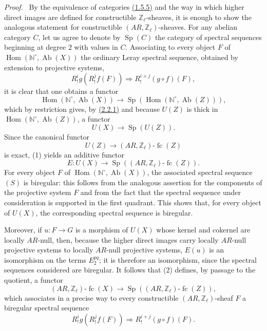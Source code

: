 \documentclass[11pt]{article}
\newenvironment{prooftext}[1][Proof]{\par\noindent\emph{#1.}\ }{\par\medskip}
\DeclareMathOperator{\Hom}{Hom}
\providecommand{\Hom}{\operatorname{Hom}}
\providecommand{\Sp}{\operatorname{Sp}}
\providecommand{\Ab}{\operatorname{Ab}}
\providecommand{\fc}{\operatorname{fc}}
\providecommand{\Ab}{\operatorname{Ab}}
\providecommand{\Hom}{\operatorname{Hom}}
\begin{document}
\begin{prooftext}[Proof]
By the equivalence of categories \hyperref[sga5:VI:proposition:1.5.5]{(1.5.5)} and the way in which higher direct images are defined for constructible \(\mathbb Z_\ell\)-sheaves, it is enough to show the analogous statement for constructible \((AR,\mathbb Z_\ell)\)-sheaves. For any abelian category \(C\), let us agree to denote by \(\Sp(C)\) the category of spectral sequences beginning at degree \(2\) with values in \(C\). Associating to every object \(F\) of \(\Hom(\mathbb N^\circ,\Ab(X))\) the ordinary Leray spectral sequence, obtained by extension to projective systems,
\[
R^i_! g(R^j_! f(F))\Longrightarrow R^{i+j}_!(g\circ f)(F),
\tag{S}\label{sga5:VI:equation:s}
\]
it is clear that one obtains a functor
\[
\Hom(\mathbb N^\circ,\Ab(X))\longrightarrow \Sp(\Hom(\mathbb N^\circ,\Ab(Z))),
\]
which by restriction gives, by \hyperref[sga5:VI:lemma:2.2.1]{(2.2.1)} and because \(U(Z)\) is thick in \(\Hom(\mathbb N^\circ,\Ab(Z))\), a functor
\[
U(X)\longrightarrow \Sp(U(Z)).
\tag{1}\label{sga5:VI:equation:1:3}
\]
Since the canonical functor
\[
U(Z)\longrightarrow (AR,\mathbb Z_\ell)\text{-}\fc(Z)
\]
is exact, (1) yields an additive functor
\[
E:U(X)\longrightarrow \Sp((AR,\mathbb Z_\ell)\text{-}\fc(Z)).
\tag{2}\label{sga5:VI:equation:2:2}
\]
For every object \(F\) of \(\Hom(\mathbb N^\circ,\Ab(X))\), the associated spectral sequence \((S)\) is biregular: this follows from the analogous assertion for the components of the projective system \(F\) and from the fact that the spectral sequence under consideration is supported in the first quadrant. This shows that, for every object of \(U(X)\), the corresponding spectral sequence is biregular.

Moreover, if \(u:F\to G\) is a morphism of \(U(X)\) whose kernel and cokernel are locally \(AR\)-null, then, because the higher direct images carry locally \(AR\)-null projective systems to locally \(AR\)-null projective systems, \(E(u)\) is an isomorphism on the terms \(E_2^{pq}\); it is therefore an isomorphism, since the spectral sequences considered are biregular. It follows that (2) defines, by passage to the quotient, a functor
\[
(AR,\mathbb Z_\ell)\text{-}\fc(X)
\longrightarrow \Sp((AR,\mathbb Z_\ell)\text{-}\fc(Z)),
\tag{3}\label{sga5:VI:equation:3}
\]
which associates in a precise way to every constructible \((AR,\mathbb Z_\ell)\)-sheaf \(F\) a biregular spectral sequence
\[
R^i_!g(R^j_!f(F))\Longrightarrow R^{i+j}_!(g\circ f)(F).
\]
\end{prooftext}
\end{document}
